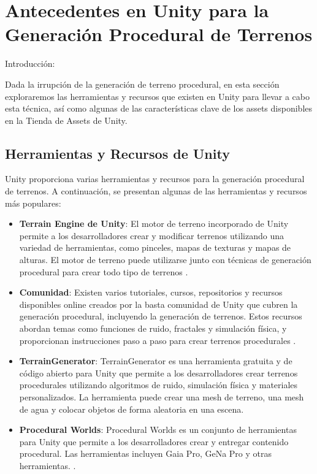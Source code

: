 \section{Antecedentes en Unity para la Generación Procedural de Terrenos}

Introducción:

Dada la irrupción de la generación de terreno procedural, en esta sección exploraremos las herramientas y recursos que existen en Unity para llevar a cabo esta técnica, así como algunas de las características clave de los assets disponibles en la Tienda de Assets de Unity.

\subsection{Herramientas y Recursos de Unity}

Unity proporciona varias herramientas y recursos para la generación procedural de terrenos. A continuación, se presentan algunas de las herramientas y recursos más populares:

\begin{itemize}
    \item \textbf{Terrain Engine de Unity}: El motor de terreno incorporado de Unity permite a los desarrolladores crear y modificar terrenos utilizando una variedad de herramientas, como pinceles, mapas de texturas y mapas de alturas. El motor de terreno puede utilizarse junto con técnicas de generación procedural para crear todo tipo de terrenos \cite{UnityTerrain}.
    
    \item \textbf{Comunidad}: Existen varios tutoriales, cursos, repositorios y recursos disponibles online creados por la basta comunidad de Unity que cubren la generación procedural, incluyendo la generación de terrenos. Estos recursos abordan temas como funciones de ruido, fractales y simulación física, y proporcionan instrucciones paso a paso para crear terrenos procedurales .
    
    \item \textbf{TerrainGenerator}: TerrainGenerator es una herramienta gratuita y de código abierto para Unity que permite a los desarrolladores crear terrenos procedurales utilizando algoritmos de ruido, simulación física y materiales personalizados. La herramienta puede crear una mesh de terreno, una mesh de agua y colocar objetos de forma aleatoria en una escena\cite{TerrainGenerator}.
    
    \item \textbf{Procedural Worlds}: Procedural Worlds es un conjunto de herramientas para Unity que permite a los desarrolladores crear y entregar contenido procedural. Las herramientas incluyen Gaia Pro, GeNa Pro y otras herramientas. \cite{ProceduralWorlds}.
    
\end{itemize}

